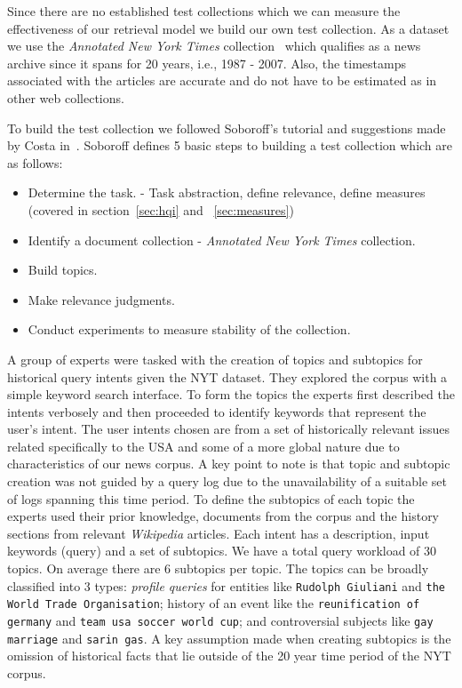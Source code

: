 Since there are no established test collections which we can measure the effectiveness of our retrieval model we build our own test collection. As a dataset we use the \emph{Annotated New York Times} collection~\cite{nyt} which qualifies as a news archive since it spans for 20 years, i.e., 1987 - 2007. Also, the timestamps associated with the articles are accurate and do not have to be estimated as in other web collections. 

To build the test collection we followed Soboroff's tutorial \cite{soboroff2013building} and suggestions made by Costa in~\cite{costa2012evaluating}. Soboroff defines 5 basic steps to building a test collection which are as follows:

\begin{itemize}
	\item Determine the task. - Task abstraction, define relevance, define measures (covered in section~\ref{sec:hqi} and ~\ref{sec:measures})
	\item Identify a document collection - \emph{Annotated New York Times} collection.
	\item Build topics.
	\item Make relevance judgments.
	\item Conduct experiments to measure stability of the collection.
\end{itemize}

A group of experts were tasked with the creation of topics and subtopics for historical query intents given the NYT dataset. They explored the corpus with a simple keyword search interface. To form the topics the experts first described the intents verbosely and then proceeded to identify keywords that represent the user's intent. The user intents chosen are from a set of historically relevant issues related specifically to the USA and some of a more global nature due to characteristics of our news corpus. A key point to note is that topic and subtopic creation was not guided by a query log due to the unavailability of a suitable set of logs spanning this time period. To define the subtopics of each topic the experts used their prior knowledge, documents from the corpus and the history sections from relevant \emph{Wikipedia} articles. Each intent has a description, input keywords (query) and a set of subtopics. We have a total query workload of 30 topics. On average there are 6 subtopics per topic. The topics can be broadly classified into 3 types: \emph{profile queries} for entities like \texttt{Rudolph Giuliani} and \texttt{the World Trade Organisation}; history of an event like the \texttt{reunification of germany} and \texttt{team usa soccer world cup}; and controversial subjects like \texttt{gay marriage} and \texttt{sarin gas}. A key assumption made when creating subtopics is the omission of historical facts that lie outside of the 20 year time period of the NYT corpus. 

